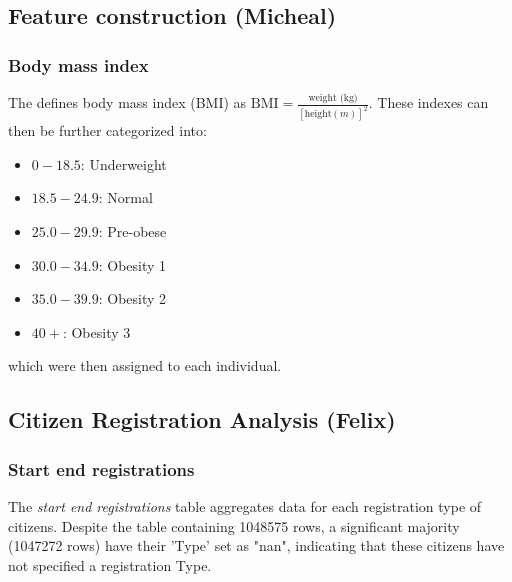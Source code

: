 \documentclass[12pt]{article}
\begin{document}

\subsection{Feature construction (Micheal)}
		
		\subsubsection{Body mass index}
		
		The \cite{WHO_BMI} defines body mass index (BMI) as $\text{BMI} = \frac{\text{weight (kg)}}{\left[\text{height} (m)\right]^2}$. These indexes can then be further categorized into:
		
		\begin{itemize}
			\item $0 - 18.5$: Underweight
			\item $18.5-24.9$: Normal
			\item $25.0-29.9$: Pre-obese
			\item $30.0-34.9$: Obesity 1
			\item $35.0-39.9$: Obesity 2
			\item $40+$: Obesity 3
		\end{itemize}
		
		which were then assigned to each individual.


\subsection{Citizen Registration Analysis (Felix)}

\subsubsection{Start end registrations}
The \textit{start end registrations} table aggregates data for each registration type of citizens. 
Despite the table containing 1048575 rows, a significant majority (1047272 rows) have their 'Type' set as "nan", indicating that these citizens have not specified a registration Type.
\end{document}
